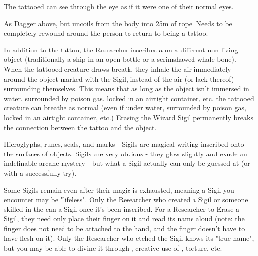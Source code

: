 
The tattooed can see through the eye as if it were one of their normal eyes.


As Dagger above, but uncoils from the body into 25m of rope. Needs to be completely rewound around the person to return to being a tattoo.



In addition to the tattoo, the Researcher inscribes a  on a different non-living object (traditionally a ship in an open bottle or a scrimshawed whale bone). When the tattooed creature draws breath, they inhale the air immediately around the object marked with the Sigil, instead of the air (or lack thereof) surrounding themselves. This means that as long as the object isn't immersed in water, surrounded by poison gas, locked in an airtight container, etc. the tattooed creature can breathe as normal (even if under water, surrounded by poison gas, locked in an airtight container, etc.) Erasing the Wizard Sigil permanently breaks the connection between the tattoo and the object.

\newpage


Hieroglyphs, runes, seals, and marks - Sigils are magical writing inscribed onto the surfaces of objects. Sigils are very obvious - they glow slightly and exude an indefinable arcane mystery - but what a Sigil actually  can only be guessed at (or with a successfully  try). 

Some Sigils remain even after their magic is exhausted, meaning a Sigil you encounter may be "lifeless". Only the Researcher who created a Sigil or someone skilled in the  can  a Sigil once it's been inscribed. For a Researcher to Erase a Sigil, they need only place their finger on it and read its name aloud (note: the finger does not need to be attached to the hand, and the finger doesn't have to have flesh on it).  Only the Researcher who etched the Sigil knows its "true name", but you may be able to divine it through , creative use of , torture, etc.

